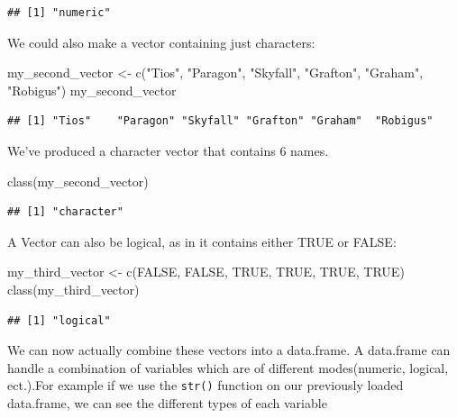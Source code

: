 \documentclass[
]{book}
\newenvironment{Shaded}{\begin{snugshade}}{\end{snugshade}}
\newcommand{\ConstantTok}[1]{\textcolor[rgb]{0.00,0.00,0.00}{#1}}
\newcommand{\FunctionTok}[1]{\textcolor[rgb]{0.00,0.00,0.00}{#1}}
\newcommand{\NormalTok}[1]{#1}
\newcommand{\OtherTok}[1]{\textcolor[rgb]{0.56,0.35,0.01}{#1}}
\newcommand{\StringTok}[1]{\textcolor[rgb]{0.31,0.60,0.02}{#1}}
\begin{document}
\begin{verbatim}
## [1] "numeric"
\end{verbatim}

We could also make a vector containing just characters:

\begin{Shaded}
\begin{Highlighting}[]
\NormalTok{my\_second\_vector }\OtherTok{\textless{}{-}} \FunctionTok{c}\NormalTok{(}\StringTok{"Tios"}\NormalTok{, }\StringTok{"Paragon"}\NormalTok{, }\StringTok{"Skyfall"}\NormalTok{, }\StringTok{"Grafton"}\NormalTok{, }
    \StringTok{"Graham"}\NormalTok{, }\StringTok{"Robigus"}\NormalTok{)}
\NormalTok{my\_second\_vector}
\end{Highlighting}
\end{Shaded}

\begin{verbatim}
## [1] "Tios"    "Paragon" "Skyfall" "Grafton" "Graham"  "Robigus"
\end{verbatim}

We've produced a character vector that contains 6 names.

\begin{Shaded}
\begin{Highlighting}[]
\FunctionTok{class}\NormalTok{(my\_second\_vector)}
\end{Highlighting}
\end{Shaded}

\begin{verbatim}
## [1] "character"
\end{verbatim}

A Vector can also be logical, as in it contains either TRUE or FALSE:

\begin{Shaded}
\begin{Highlighting}[]
\NormalTok{my\_third\_vector }\OtherTok{\textless{}{-}} \FunctionTok{c}\NormalTok{(}\ConstantTok{FALSE}\NormalTok{, }\ConstantTok{FALSE}\NormalTok{, }\ConstantTok{TRUE}\NormalTok{, }\ConstantTok{TRUE}\NormalTok{, }\ConstantTok{TRUE}\NormalTok{, }\ConstantTok{TRUE}\NormalTok{)}
\FunctionTok{class}\NormalTok{(my\_third\_vector)}
\end{Highlighting}
\end{Shaded}

\begin{verbatim}
## [1] "logical"
\end{verbatim}

We can now actually combine these vectors into a data.frame. A data.frame can handle a combination of variables which are of different modes(numeric, logical, ect.).For example if we use the \texttt{str()} function on our previously loaded data.frame, we can see the different types of each variable
\end{document}
